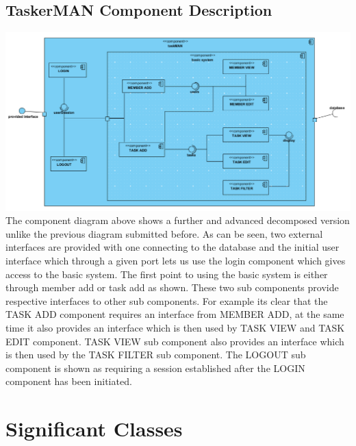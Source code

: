 \documentclass{project}
\begin{document}
\subsection{TaskerMAN Component Description}
\includegraphics[width=1\textwidth, center]{images/Detailed-Design/TaskerMANComponentDiagram}
The component diagram above shows a further and advanced decomposed version unlike the previous diagram submitted before.  As can be seen, two external interfaces are provided with one connecting to the database and the initial user interface which through a given port lets us use the login component which gives access to the basic system.  The first point to using the basic system is either through member add or task add as shown. These two sub components provide respective interfaces to other sub components.  For example its clear that the TASK ADD component requires  an interface from MEMBER ADD, at the same time it also provides an interface which is then used by TASK VIEW and TASK EDIT component. TASK VIEW sub component also provides an interface which is then used by the TASK FILTER sub component. 
The LOGOUT sub component is shown as requiring a session established after the LOGIN component has been initiated. \\
\section{Significant Classes} 
\end{document}
